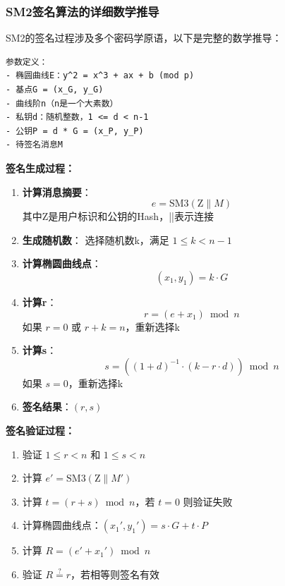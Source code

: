 ﻿\documentclass[12pt,a4paper]{article}
\begin{document}
\subsubsection{SM2签名算法的详细数学推导}

SM2的签名过程涉及多个密码学原语，以下是完整的数学推导：

\begin{lstlisting}
参数定义：
- 椭圆曲线E：y^2 = x^3 + ax + b (mod p)
- 基点G = (x_G, y_G)
- 曲线阶n（n是一个大素数）
- 私钥d：随机整数，1 <= d < n-1
- 公钥P = d * G = (x_P, y_P)
- 待签名消息M
\end{lstlisting}

\textbf{签名生成过程：}

\begin{enumerate}[leftmargin=1.5em]
\item \textbf{计算消息摘要}：
$$e = \text{SM3}(\text{Z} \| M)$$
其中Z是用户标识和公钥的Hash，||表示连接

\item \textbf{生成随机数}：
选择随机数k，满足 $1 \leq k < n-1$

\item \textbf{计算椭圆曲线点}：
$$(x_1, y_1) = k \cdot G$$

\item \textbf{计算r}：
$$r = (e + x_1) \bmod n$$
如果 $r = 0$ 或 $r + k = n$，重新选择k

\item \textbf{计算s}：
$$s = ((1 + d)^{-1} \cdot (k - r \cdot d)) \bmod n$$
如果 $s = 0$，重新选择k

\item \textbf{签名结果}：$(r, s)$
\end{enumerate}

\textbf{签名验证过程：}

\begin{enumerate}[leftmargin=1.5em]
\item 验证 $1 \leq r < n$ 和 $1 \leq s < n$
\item 计算 $e' = \text{SM3}(\text{Z} \| M')$
\item 计算 $t = (r + s) \bmod n$，若 $t = 0$ 则验证失败
\item 计算椭圆曲线点：$(x_1', y_1') = s \cdot G + t \cdot P$
\item 计算 $R = (e' + x_1') \bmod n$
\item 验证 $R \stackrel{?}{=} r$，若相等则签名有效
\end{enumerate}
\end{document}
